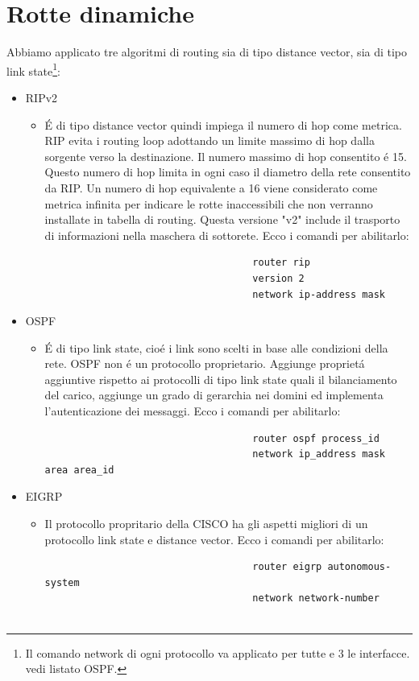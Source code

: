 \documentclass[9pt, a4paper, oneside]{article}
\begin{document}
		\section{Rotte dinamiche}
			\par
				Abbiamo applicato tre algoritmi di 
				routing sia di tipo distance vector, sia di 
				tipo link state\footnote{Il comando network di ogni protocollo va applicato per tutte e 3 le interfacce. vedi listato OSPF.}:
				\begin{itemize}
					\item
						RIPv2
						\begin{itemize}
							\item
								\'E di tipo 
								distance 
								vector quindi impiega il numero di hop come metrica. RIP evita i routing loop adottando un limite massimo di hop dalla sorgente verso la destinazione. Il numero massimo di hop consentito \'e 15. Questo numero di hop limita in ogni caso il diametro della rete consentito da RIP. Un numero di hop equivalente a 16 viene considerato come metrica infinita per indicare le rotte inaccessibili che non verranno installate in tabella di routing. Questa versione "v2" include il trasporto di informazioni nella maschera di sottorete. Ecco i comandi per abilitarlo:
								\begin{verbatim}
									router rip
									version 2
									network ip-address mask
								\end{verbatim}
						\end{itemize}
					\item
						OSPF
						\begin{itemize}
							\item
								\'E di tipo 
								link state, 
								cio\'e i link 
								sono scelti in 
								base alle 
								condizioni 
								della rete. 
								OSPF non \'e un 
								protocollo 
								proprietario.
								Aggiunge propriet\'a aggiuntive
                            	rispetto ai protocolli di tipo 								
                                link state quali il bilanciamento del carico, 
                                aggiunge un grado di gerarchia nei domini ed 
                                implementa l'autenticazione dei messaggi.
								Ecco i comandi per abilitarlo:								
								\begin{verbatim}
									router ospf process_id
									network ip_address mask area area_id
								\end{verbatim}
						\end{itemize}
					\item
						EIGRP
						\begin{itemize}
							\item
								Il protocollo 
								propritario 
								della CISCO ha 
								gli aspetti 
								migliori di un 
								protocollo link 
								state e 
								distance 
								vector.
								Ecco i comandi per abilitarlo:
								\begin{verbatim}
									router eigrp autonomous-system
									network network-number
									
								\end{verbatim}
						\end{itemize}
				\end{itemize}
		\newpage	
\end{document}
